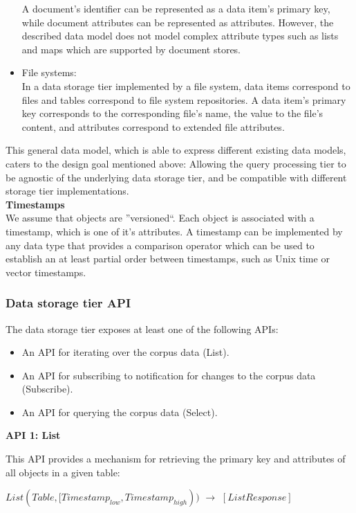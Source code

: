 \begin{itemize}
  A document's identifier can be represented as a data item's primary key, while document attributes can be represented
  as attributes.
  However, the described data model does not model complex attribute types such as lists and maps which are supported by
  document stores.
  \item File systems: \\
  In a data storage tier implemented by a file system, data items correspond to files and tables correspond to file
  system repositories.
  A data item's primary key corresponds to the corresponding file's name, the value to the file's content, and attributes
  correspond to extended file attributes.
\end{itemize}

This general data model, which is able to express different existing data models, caters to the design goal mentioned
above:
Allowing the query processing tier to be agnostic of the underlying data storage tier, and be compatible with different
storage tier implementations. \\

\noindent \textbf{Timestamps} \\
We assume that objects are ''versioned``.
Each object is associated with a timestamp, which is one of it's attributes.
A timestamp can be implemented by any data type that provides a comparison operator which can be used to establish an
at least partial order between timestamps, such as Unix time or vector timestamps.


\subsubsection{Data storage tier API}

The data storage tier exposes at least one of the following APIs:
\begin{itemize}
  \item An API for iterating over the corpus data (List).
  \item An API for subscribing to notification for changes to the corpus data (Subscribe).
  \item An API for querying the corpus data (Select).
\end{itemize}

\noindent
\textbf{API 1: List}

\noindent
This API provides a mechanism for retrieving the primary key and attributes of all objects in a given table:

$List(Table, [Timestamp_{low}, Timestamp_{high}))$ $\rightarrow$ $[ListResponse]$

